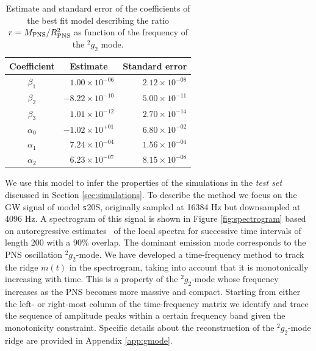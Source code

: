 
\begin{table}[h]

  \begin{tabular}{crr}
    \hline
    Coefficient & \multicolumn{1}{c}{Estimate} & Standard error \\
    \hline
   $\beta_1$  &  $ 1.00 \times 10^{-06}$ & $2.12 \times 10^{-08}$ \\   
   $\beta_2$  &  $-8.22 \times 10^{-10}$ & $5.00 \times 10^{-11}$ \\
   $\beta_3$  &  $ 1.01 \times 10^{-12}$ & $2.70 \times 10^{-14}$ \\
   $\alpha_0$ &  $-1.02 \times 10^{+01}$ & $6.80 \times 10^{-02}$ \\
   $\alpha_1$ &  $ 7.24 \times 10^{-04}$ & $1.56 \times 10^{-04}$ \\
   $\alpha_2$ &  $ 6.23 \times 10^{-07}$ & $8.15 \times 10^{-08}$ \\   
    \hline
  \end{tabular}
\caption{Estimate and standard error of the coefficients of the best fit model describing the ratio $r=M_{\rm PNS}/R_{\rm PNS}^2$ as function of the frequency of the $\mbox{}^2g_2$ mode.}\label{tab:model}
\end{table}



{We use this model to infer the properties of the simulations in the 
{\it test set} discussed in Section \ref{sec:simulations}.}
To describe the method we focus on the GW signal
of model {\texttt s20S}, originally
sampled at 16384 Hz but downsampled at 4096 Hz.
A spectrogram of this signal is shown in Figure \ref{fig:spectrogram} based on
autoregressive estimates~\cite{BrockwellPeterJ1991Tsta} of the local spectra for successive time intervals of 
length 200 with a 90\% overlap.
The dominant emission mode corresponds to the PNS oscillation $\mbox{}^2 g_2$-mode. We have
developed a time-frequency method to track the ridge $m(t) $ in the spectrogram,
taking into account that it is monotonically increasing with time. 
This is a property of the $\mbox{}^2 g_2$-mode whose frequency   
increases as the PNS becomes more massive and compact.
Starting from either the left- or right-most column of the time-frequency matrix
we identify and trace the sequence of amplitude peaks within a certain frequency
band given the monotonicity constraint. Specific details about the reconstruction of the $\mbox{}^2 g_2$-mode ridge 
are provided in Appendix \ref{app:gmode}. 

